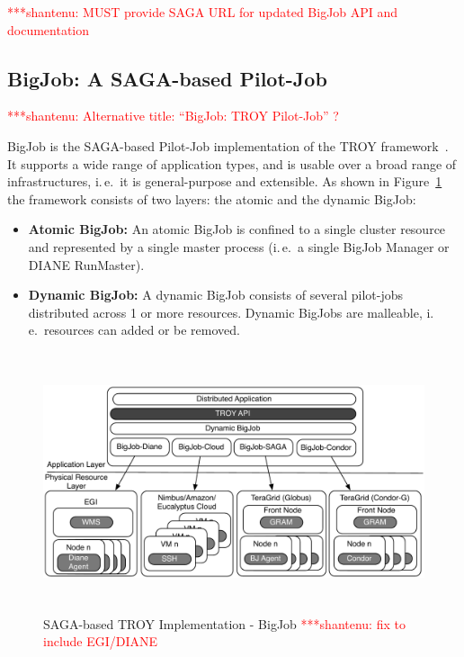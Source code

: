 \documentclass[conference,final]{IEEEtran}
\newcommand{\jhanote}[1]{ {\textcolor{red} { ***shantenu: #1 }}}
\newcommand{\jhanote}[1]{}
\begin{document}
\jhanote{MUST provide SAGA URL for updated BigJob API and
  documentation}\cite{troy_api}

\subsection{BigJob: A SAGA-based Pilot-Job}

\jhanote{Alternative title: ``BigJob: TROY Pilot-Job'' ?}


BigJob is the SAGA-based Pilot-Job implementation of the TROY
framework~\cite{bigjob_web}. 
It supports a wide range of application types, and is
usable over a broad range of infrastructures, i.\,e.\ it is
general-purpose and extensible.  As shown in Figure~\ref{fig:figures_distributed_pilot_job} the framework consists of two layers: the atomic and the dynamic BigJob:
\begin{itemize}
   \item  \textbf{Atomic BigJob:} An atomic BigJob is confined to a single 
   cluster resource and represented by a single master process (i.\,e.\ a 
   single BigJob Manager or DIANE RunMaster).
	\item \textbf{Dynamic BigJob:} A dynamic BigJob consists of several 
	pilot-jobs distributed across 1 or more resources. Dynamic BigJobs are 
	malleable, i.\,e.\ resources can added or be removed.
\end{itemize}

\begin{figure}[htbp]
	\centering
		\includegraphics[height=3in]{figures/distributed_pilot_job.pdf}
	\caption{SAGA-based TROY Implementation - BigJob \jhanote{fix
            to include EGI/DIANE}}
	\label{fig:figures_distributed_pilot_job}
\end{figure}
\end{document}
